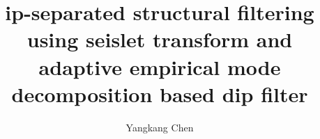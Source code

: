 \title{ip-separated structural filtering using seislet transform and adaptive empirical mode decomposition based dip filter}

\renewcommand{\thefootnote}{\fnsymbol{footnote}}
\author{Yangkang Chen}

\address{
\footnotemark[1]Bureau of Economic Geology \\
John A. and Katherine G. Jackson School of Geosciences \\
The University of Texas at Austin \\
University Station, Box X \\
Austin, TX 78713-8924 \\
ykchen@utexas.edu
}

\maketitle

\DeclareRobustCommand{\dlo}[1]{\ifthenelse{\boolean{@revd}}{}{}}
\DeclareRobustCommand{\wen}[1]{%
  \ifthenelse{\boolean{@revd}}{\textcolor{black}{#1}}{#1}}
  
